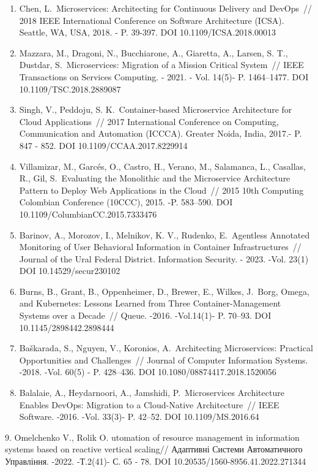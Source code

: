 {\begin{enumerate}
\def\labelenumi{\arabic{enumi}.}
\item
  Chen, L.~Microservices: Architecting for Continuous Delivery and
  DevOps~// 2018 IEEE International Conference on Software Architecture
  (ICSA). Seattle, WA, USA, 2018. - P. 39-397. DOI
  10.1109/ICSA.2018.00013
\item
  Mazzara, M., Dragoni, N., Bucchiarone, A., Giaretta, A., Larsen, S.
  T., Dustdar, S.~Microservices: Migration of a Mission Critical
  System~// IEEE Transactions on Services Computing. - 2021. - Vol.
  14(5)- P. 1464--1477. DOI 10.1109/TSC.2018.2889087
\item
  Singh, V., Peddoju, S. K.~Container-based Microservice Architecture
  for Cloud Applications~// 2017 International Conference on Computing,
  Communication and Automation (ICCCA). Greater Noida, India, 2017.- P.
  847 - 852. DOI 10.1109/CCAA.2017.8229914
\item
  Villamizar, M., Garcés, O., Castro, H., Verano, M., Salamanca, L.,
  Casallas, R., Gil, S.~Evaluating the Monolithic and the Microservice
  Architecture Pattern to Deploy Web Applications in the Cloud~// 2015
  10th Computing Colombian Conference (10CCC), 2015. -P. 583--590. DOI
  10.1109/ColumbianCC.2015.7333476
\item
  Barinov, A., Morozov, I., Melnikov, K. V., Rudenko, E.~Agentless
  Annotated Monitoring of User Behavioral Information in Container
  Infrastructures~// Journal of the Ural Federal District. Information
  Security. - 2023. -Vol. 23(1) DOI 10.14529/secur230102
\item
  Burns, B., Grant, B., Oppenheimer, D., Brewer, E., Wilkes, J.~Borg,
  Omega, and Kubernetes: Lessons Learned from Three Container-Management
  Systems over a Decade~// Queue. -2016. -Vol.14(1)- P. 70--93. DOI
  10.1145/2898442.2898444
\item
  Baškarada, S., Nguyen, V., Koronios, A.~Architecting Microservices:
  Practical Opportunities and Challenges~// Journal of Computer
  Information Systems. -2018. -Vol. 60(5) - P. 428--436. DOI
  10.1080/08874417.2018.1520056
\item
  Balalaie, A., Heydarnoori, A., Jamshidi, P.~Microservices Architecture
  Enables DevOps: Migration to a Cloud-Native Architecture~// IEEE
  Software. -2016. -Vol. 33(3)- P. 42--52. DOI 10.1109/MS.2016.64
\end{enumerate}

9. Omelchenko V., Rolik O. utomation of resource management in
information systems based on reactive vertical scaling// Адаптивні
Системи Автоматичного Управління. -2022. -Т.2(41)- С. 65 - 78. DOI
10.20535/1560-8956.41.2022.271344

}
